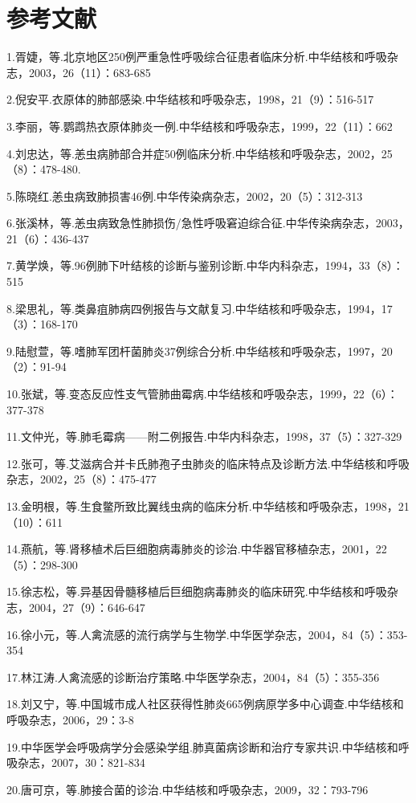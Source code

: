 \section{参考文献}

1.胥婕，等.北京地区250例严重急性呼吸综合征患者临床分析.中华结核和呼吸杂志，2003，26（11）：683-685

2.倪安平.衣原体的肺部感染.中华结核和呼吸杂志，1998，21（9）：516-517

3.李丽，等.鹦鹉热衣原体肺炎一例.中华结核和呼吸杂志，1999，22（11）：662

4.刘忠达，等.恙虫病肺部合并症50例临床分析.中华结核和呼吸杂志，2002，25（8）：478-480.

5.陈晓红.恙虫病致肺损害46例.中华传染病杂志，2002，20（5）：312-313

6.张溪林，等.恙虫病致急性肺损伤/急性呼吸窘迫综合征.中华传染病杂志，2003，21（6）：436-437

7.黄学焕，等.96例肺下叶结核的诊断与鉴别诊断.中华内科杂志，1994，33（8）：515

8.梁思礼，等.类鼻疽肺病四例报告与文献复习.中华结核和呼吸杂志，1994，17（3）：168-170

9.陆慰萱，等.嗜肺军团杆菌肺炎37例综合分析.中华结核和呼吸杂志，1997，20（2）：91-94

10.张斌，等.变态反应性支气管肺曲霉病.中华结核和呼吸杂志，1999，22（6）：377-378

11.文仲光，等.肺毛霉病------附二例报告.中华内科杂志，1998，37（5）：327-329

12.张可，等.艾滋病合并卡氏肺孢子虫肺炎的临床特点及诊断方法.中华结核和呼吸杂志，2002，25（8）：475-477

13.金明根，等.生食鳖所致比翼线虫病的临床分析.中华结核和呼吸杂志，1998，21（10）：611

14.燕航，等.肾移植术后巨细胞病毒肺炎的诊治.中华器官移植杂志，2001，22（5）：298-300

15.徐志松，等.异基因骨髓移植后巨细胞病毒肺炎的临床研究.中华结核和呼吸杂志，2004，27（9）：646-647

16.徐小元，等.人禽流感的流行病学与生物学.中华医学杂志，2004，84（5）：353-354

17.林江涛.人禽流感的诊断治疗策略.中华医学杂志，2004，84（5）：355-356

18.刘又宁，等.中国城市成人社区获得性肺炎665例病原学多中心调查.中华结核和呼吸杂志，2006，29：3-8

19.中华医学会呼吸病学分会感染学组.肺真菌病诊断和治疗专家共识.中华结核和呼吸杂志，2007，30：821-834

20.唐可京，等.肺接合菌的诊治.中华结核和呼吸杂志，2009，32：793-796

